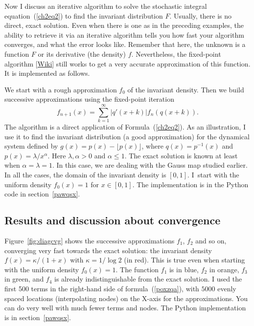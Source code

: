\documentclass[oneside,10pt]{book}
\begin{document}
Now I discuss an iterative algorithm to solve the 
\textcolor{index}{stochastic integral equation}~(\ref{ch2eq2}) to find the invariant distribution $F$. Usually, there is no direct, exact solution. Even when there is one as in the preceding examples, the ability to retrieve it via an iterative algorithm tells you how fast your algorithm converges, and what the error looks like. Remember that here, the unknown is a function $F$ or its derivative (the density) $f$. Nevertheless, the 
\textcolor{index}{fixed-point algorithm} [\href{https://en.wikipedia.org/wiki/Fixed-point_iteration}{Wiki}] 
still works to get a very accurate approximation of this function. It is implemented as follows. 

We start with a rough approximation $f_0$ of the invariant density. Then we build successive approximations using the fixed-point iteration
\begin{equation}
f_{n+1}(x) = \sum_{k=1}^\infty |q'(x+k)| f_n(q(x+k)).\label{poxzqa}
\end{equation}
The algorithm is a direct application of Formula~(\ref{ch2eq2}). As an illustration, I use it to find the invariant distribution (a good approximation) for the dynamical system
defined by $g(x)=p(x)-\lfloor p(x)\rfloor$, where $q(x)=p^{-1}(x)$ and $p(x) = \lambda / x^\alpha$. Here $\lambda,\alpha>0$
 and $\alpha\leq 1$. The
 exact solution is known at least when $\alpha=\lambda=1$. In this case, we are dealing with the Gauss map studied earlier. In all the cases,
 the domain of the invariant density is $[0, 1]$. I~start with the uniform density $f_0(x) = 1$ for $x\in [0, 1]$. The implementation is in the
Python code in section~\ref{pawqsx}.

\subsection{Results and discussion about convergence}

Figure~\ref{fig:diagcvg} shows the successive approximations $f_1$, $f_2$ and so on, converging very fast towards the exact solution: the
 invariant density $f(x) = \kappa/(1+x)$ with $\kappa = 1/\log 2$ (in red). This is true even when starting with the uniform density $f_0(x) = 1$.
 The function $f_1$ is in blue, $f_2$  in orange, $f_3$ in green, and $f_4$ is already indistinguishable from the exact solution. I used
 the first 500 terms in the right-hand side of formula~(\ref{poxzqa}), with $\num{5000}$ evenly spaced locations (interpolating nodes) on the X-axis for the
 approximations. You can do very well with much fewer terms and nodes. The Python implementation is in section~\ref{pawqsx}.
\end{document}
